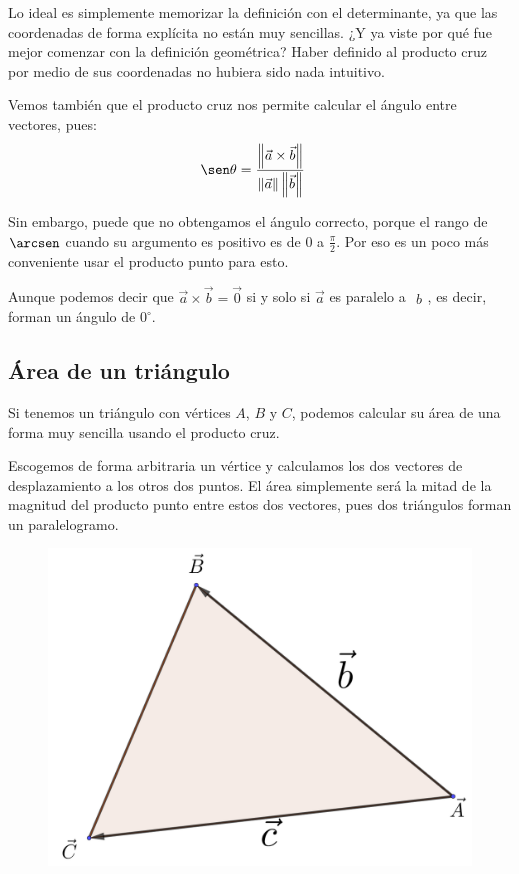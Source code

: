 \documentclass[12pt, fleqn]{report}                             %
\theoremstyle{break}                                            %
\newcommand{\Abs}[1]{\left\lVert #1 \right\lVert}               %
\newcommand{\Vector}[1]                                         %
        { \ensuremath{\begin{matrix}#1\end{matrix}} }               %
\begin{document}
            Lo ideal es simplemente memorizar la definición con el determinante, ya que las coordenadas de forma explícita no están muy sencillas. ¿Y ya viste por qué fue mejor comenzar con la definición geométrica? Haber definido al producto cruz por medio de sus coordenadas no hubiera sido nada intuitivo.
            
            Vemos también que el producto cruz nos permite calcular el ángulo entre vectores, pues:
            \begin{align}
                \sen \theta &= \dfrac{\Abs{\vec{a} \times \vec{b}}}{\Abs{\vec{a}} \Abs{\vec{b}}} \label{angleBetweenVectorsCross}
            \end{align}
            
            Sin embargo, puede que no obtengamos el ángulo correcto, porque el rango de $\arcsen$ cuando su argumento es positivo es de $0$ a $\frac{\pi}{2}$. Por eso es un poco más conveniente usar el producto punto para esto.
            
            Aunque podemos decir que $\vec{a} \times \vec{b} = \vec{0}$ si y solo si $\vec{a}$ es paralelo a $\Vector{b}$, es decir, forman un ángulo de $0^\circ$.
        
            \clearpage
        
            \subsection{Área de un triángulo}
            
            Si tenemos un triángulo con vértices $A$, $B$ y $C$, podemos calcular su área de una forma muy sencilla usando el producto cruz.
            
            Escogemos de forma arbitraria un vértice y calculamos los dos vectores de desplazamiento a los otros dos puntos. El área simplemente será la mitad de la magnitud del producto punto entre estos dos vectores, pues dos triángulos forman un paralelogramo.
            
            \begin{figure}[H]
                \centering
                \includegraphics[scale=1.3]{triangle.png}
            \end{figure}
            
\end{document}
